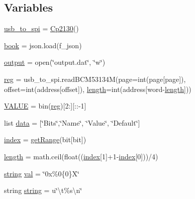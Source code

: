 \subsection*{Variables}
\begin{DoxyCompactItemize}
\item 
\hyperlink{namespaceantenna__usb__rewrite__list_a3d824bc3a35be052f6e7107422536634}{usb\+\_\+to\+\_\+spi} = \hyperlink{classantenna__usb__rewrite__list_1_1_cp2130}{Cp2130}()
\item 
\hyperlink{namespaceantenna__usb__rewrite__list_aef54274de5ca40ecd5b8ce587a3b3814}{book} = json.\+load(f\+\_\+json)
\item 
\hyperlink{namespaceantenna__usb__rewrite__list_aa1b615265707138d427863eb19fd9ecb}{output} = open(\char`\"{}output.\+dat\char`\"{}, \char`\"{}w\char`\"{})
\item 
\hyperlink{namespaceantenna__usb__rewrite__list_a4f8d71b5c1ed3ecaf8af418184761254}{reg} = usb\+\_\+to\+\_\+spi.\+read\+B\+C\+M53134M(page=int(page\mbox{[}\textquotesingle{}page\textquotesingle{}\mbox{]}), offset=int(address\mbox{[}\textquotesingle{}offset\textquotesingle{}\mbox{]}), \hyperlink{namespaceantenna__usb__rewrite__list_a7db7584b8616ae6b6bbb5720a302001a}{length}=int(address\mbox{[}\textquotesingle{}word-\/\hyperlink{namespaceantenna__usb__rewrite__list_a7db7584b8616ae6b6bbb5720a302001a}{length}\textquotesingle{}\mbox{]}))
\item 
\hyperlink{namespaceantenna__usb__rewrite__list_a57c3f351c2f378d8b32a5535ae505735}{V\+A\+L\+UE} = bin(\hyperlink{namespaceantenna__usb__rewrite__list_a4f8d71b5c1ed3ecaf8af418184761254}{reg})\mbox{[}2\+:\mbox{]}\mbox{[}\+::-\/1\mbox{]}
\item 
list \hyperlink{namespaceantenna__usb__rewrite__list_a36457b8012d0008495e696b7677c286c}{data} = \mbox{[}\char`\"{}Bits\char`\"{},\char`\"{}Name\char`\"{}, \char`\"{}Value\char`\"{}, \char`\"{}Default\char`\"{}\mbox{]}
\item 
\hyperlink{namespaceantenna__usb__rewrite__list_af12533542e50af5ea554054416933a61}{index} = \hyperlink{namespaceantenna__usb__rewrite__list_a4dfe4beb7b1df6af753add339c06c311}{get\+Range}(bit\mbox{[}\textquotesingle{}bit\textquotesingle{}\mbox{]})
\item 
\hyperlink{namespaceantenna__usb__rewrite__list_a7db7584b8616ae6b6bbb5720a302001a}{length} = math.\+ceil(float((\hyperlink{namespaceantenna__usb__rewrite__list_af12533542e50af5ea554054416933a61}{index}\mbox{[}1\mbox{]}+1-\/\hyperlink{namespaceantenna__usb__rewrite__list_af12533542e50af5ea554054416933a61}{index}\mbox{[}0\mbox{]}))/4)
\item 
\hyperlink{namespaceantenna__usb__rewrite__list_ab939ab5ad6fd12b022e0bc9ded4ccb7c}{string} \hyperlink{namespaceantenna__usb__rewrite__list_ac051df5193c46e89320db8b4ac29eb97}{val} = \char`\"{}0x\%0\{0\}\+X\char`\"{}
\item 
string \hyperlink{namespaceantenna__usb__rewrite__list_ab939ab5ad6fd12b022e0bc9ded4ccb7c}{string} = u\char`\"{}\textbackslash{}t\%s\textbackslash{}n\char`\"{}
\end{DoxyCompactItemize}


